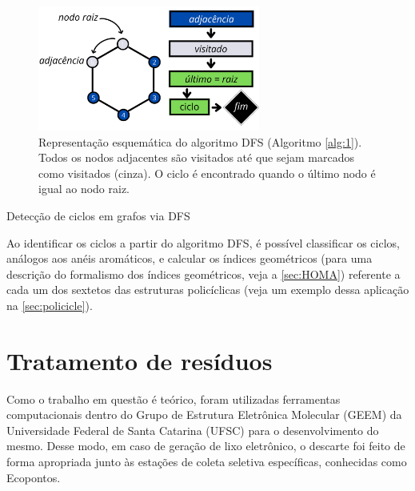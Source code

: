 \begin{figure}[htb]
\caption{\label{fig:DFS} Representação esquemática do algoritmo DFS (Algoritmo \ref{alg:1}). Todos os nodos adjacentes são visitados até que sejam marcados como visitados (cinza). O ciclo é encontrado quando o último nodo é igual ao nodo raiz.}
	\begin{center}
		\includegraphics[width=0.65\textwidth]{images/DFS.png}
	\end{center}
\end{figure}


\begin{algorithm}
\caption{Detecção de ciclos em grafos via DFS}\label{alg:1}
\LinesNumbered
{}

\end{algorithm}

Ao identificar os ciclos a partir do algoritmo \gls{DFS}, é possível classificar os ciclos, análogos aos anéis aromáticos, e calcular os índices geométricos (para uma descrição do formalismo dos índices geométricos, veja a \autoref{sec:HOMA}) referente a cada um dos sextetos das estruturas policíclicas (veja um exemplo dessa aplicação na \autoref{sec:policicle}). 

\section{Tratamento de resíduos}

Como o trabalho em questão é teórico, foram utilizadas ferramentas computacionais dentro do Grupo de Estrutura Eletrônica Molecular (GEEM) da Universidade Federal de Santa Catarina (UFSC) para o desenvolvimento do mesmo. Desse modo, em caso de geração de lixo eletrônico, o descarte foi feito de forma apropriada junto às estações de coleta seletiva específicas, conhecidas como Ecopontos.